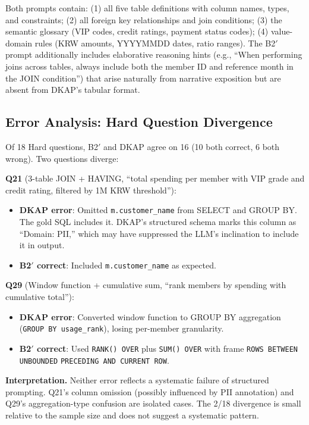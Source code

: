 \documentclass[10pt,a4paper]{article}
\begin{document}
Both prompts contain: (1) all five table definitions with column names, types, and constraints; (2) all foreign key relationships and join conditions; (3) the semantic glossary (VIP codes, credit ratings, payment status codes); (4) value-domain rules (KRW amounts, YYYYMMDD dates, ratio ranges). The B2$'$ prompt additionally includes elaborative reasoning hints (e.g., ``When performing joins across tables, always include both the member ID and reference month in the JOIN condition'') that arise naturally from narrative exposition but are absent from DKAP's tabular format.

\subsection{Error Analysis: Hard Question Divergence}

Of 18 Hard questions, B2$'$ and DKAP agree on 16 (10 both correct, 6 both wrong). Two questions diverge:

\textbf{Q21} (3-table JOIN + HAVING, ``total spending per member with VIP grade and credit rating, filtered by 1M KRW threshold''):
\begin{itemize}
\item \textbf{DKAP error}: Omitted \texttt{m.customer\_name} from SELECT and GROUP BY. The gold SQL includes it. DKAP's structured schema marks this column as ``Domain: PII,'' which may have suppressed the LLM's inclination to include it in output.
\item \textbf{B2$'$ correct}: Included \texttt{m.customer\_name} as expected.
\end{itemize}

\textbf{Q29} (Window function + cumulative sum, ``rank members by spending with cumulative total''):
\begin{itemize}
\item \textbf{DKAP error}: Converted window function to GROUP BY aggregation (\texttt{GROUP BY usage\_rank}), losing per-member granularity.
\item \textbf{B2$'$ correct}: Used \texttt{RANK() OVER} plus \texttt{SUM() OVER} with frame \texttt{ROWS BETWEEN UNBOUNDED} \texttt{PRECEDING AND CURRENT ROW}.
\end{itemize}

\textbf{Interpretation.} Neither error reflects a systematic failure of structured prompting. Q21's column omission (possibly influenced by PII annotation) and Q29's aggregation-type confusion are isolated cases. The 2/18 divergence is small relative to the sample size and does not suggest a systematic pattern.
\end{document}
